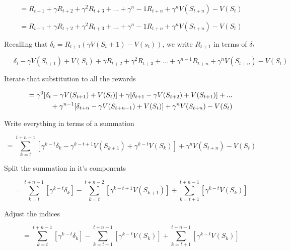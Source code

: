 \documentclass[10pt,a4paper]{article}
\begin{document}
\begin{equation*}
    = R_{t+1} + \gamma R_{t+2} + \gamma^2 R_{t+3} + ... + \gamma^n-1 R_{t+n}+ \gamma^n V (S_{t+n}) - V (S_t)
\end{equation*}

\begin{equation*}
    = R_{t+1} + \gamma R_{t+2} + \gamma^2 R_{t+3} + ... + \gamma^n-1 R_{t+n}+ \gamma^n V (S_{t+n}) - V (S_t)
\end{equation*}

Recalling that $\delta_t = R_{t+1}(\gamma V(S_t+1) - V(s_t))$, we write $R_{t+1}$ in terms of $\delta_t$ 

\begin{equation*}
    = \delta_t - \gamma V(S_{t+1}) + V(S_{t}) + \gamma R_{t+2} + \gamma^2 R_{t+3} + ... + \gamma^{n-1} R_{t+n}+ \gamma^n V (S_{t+n}) - V (S_t) 
\end{equation*}

Iterate that substitution to all the rewards

\begin{align*}
    = \gamma^0 [\delta_t - \gamma V(S_{t+1}) + V(S_{t})] + \gamma[\delta_{t+1} - \gamma V(S_{t+2}) + V(S_{t+1})] + ... \\ \newline
    + \gamma^{n-1}[\delta_{t+n} - \gamma V(S_{t+n-1}) + V(S_{t})] + \gamma^n V (S_{t+n}) - V (S_t)            
\end{align*}

Write everything in terms of a summation

\begin{equation*}
    =  \sum_{k = t}^{t+n-1} [\gamma^{k-t}\delta_{k} - \gamma^{k-t+1} V(S_{k+1}) +\gamma^{k-t} V(S_{k})] + \gamma^n V (S_{t+n}) - V (S_t) 
\end{equation*}

Split the summation in it's components

\begin{equation*}
    =  \sum_{k = t}^{t+n-1} [\gamma^{k-t}\delta_{k}] -\sum_{k = t}^{t+n-2} [\gamma^{k-t+1} V(S_{k+1})] + \sum_{k = t+1}^{t+n-1}[\gamma^{k-t} V(S_{k})] 
\end{equation*}

Adjust the indices

\begin{equation*}
    =  \sum_{k = t}^{t+n-1} [\gamma^{k-t}\delta_{k}] -\sum_{k = t+1}^{t+n-1} [\gamma^{k-t} V(S_{k})] + \sum_{k = t+1}^{t+n-1}[\gamma^{k-t} V(S_{k})] 
\end{equation*}
\end{document}
